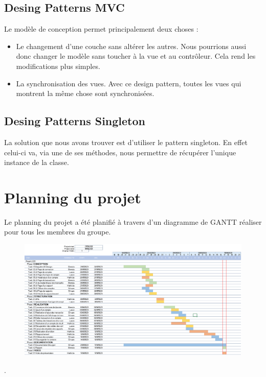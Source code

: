 \documentclass[10pt,a4paper,openany]{report}
\begin{document}
	\subsection{Desing Patterns MVC}
	Le modèle de conception permet principalement deux choses :
	\begin{itemize}
		\item Le changement d'une couche sans altérer les autres.  Nous pourrions aussi donc changer le modèle sans toucher à la vue et au contrôleur. Cela rend les modifications plus simples.
		\item La synchronisation des vues. Avec ce design pattern, toutes les vues qui montrent la même chose sont synchronisées.

	\end{itemize}
	
	\subsection{Desing Patterns Singleton}
	La solution que nous avons trouver est d'utiliser le pattern singleton. En effet celui-ci va, via une de ses méthodes, nous permettre de récupérer l'unique instance de la classe.
	
	\section{Planning du projet}
	
	Le planning du projet a été planifié à travers d'un diagramme de GANTT réaliser pour tous les membres du groupe.
	
	\begin{figure}[H]
		\begin{center}
			\includegraphics[width = 1\textwidth]{GANTT.PNG}
		\end{center} 
	\end{figure}.
\end{document}
